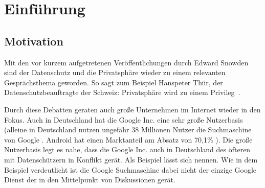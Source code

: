 %
% 

\chapter{Einführung}


\section{Motivation}
Mit den vor kurzem aufgetretenen Veröffentlichungen durch Edward Snowden sind der Datenschutz und die Privatsphäre wieder zu einem relevanten Gesprächsthema geworden. So sagt zum Beispiel Hanspeter Thür, der Datenschutzbeauftragte der Schweiz: \glqq Privatsphäre wird zu einem Privileg\grqq\ \cite{nzzdatenschutzprivileg}.

Durch diese Debatten geraten auch große Unternehmen im Internet wieder in den Fokus. Auch in Deutschland hat die Google Inc. eine sehr große Nutzerbasis (alleine in Deutschland nutzen ungefähr 38 Millionen Nutzer die Suchmaschine von Google \cite{statistagoogle}. Android hat einen Marktanteil am Absatz von 70,1\% \cite{statistaandroid}). Die große Nutzerbasis legt es nahe, dass die Google Inc. auch in Deutschland des öfteren mit Datenschützern in Konflikt gerät. Als Beispiel lässt sich \citet{geodata} nennen. Wie in dem Beispiel verdeutlicht ist die Google Suchmaschine dabei nicht der einzige Google Dienst der in den Mittelpunkt von Diskussionen gerät.

